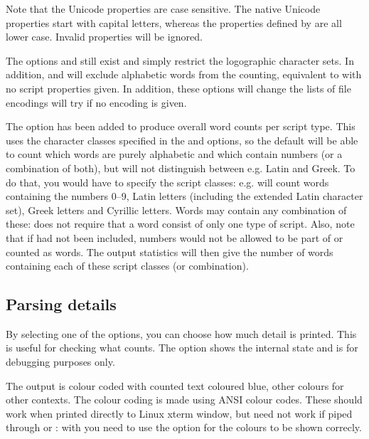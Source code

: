 \documentclass{article}
\begin{document}
Note that the Unicode properties are case sensitive. The native Unicode properties start with capital letters, whereas the properties defined by \TeXcount{} are all lower case. Invalid properties will be ignored.

The options  and  still exist and simply restrict the logographic character sets. In addition,  and  will exclude alphabetic words from the counting, equivalent to  with no script properties given. In addition, these options will change the lists of file encodings \TeXcount{} will try if no encoding is given.

The option  has been added to produce overall word counts per script type. This uses the character classes specified in the  and  options, so the default will be able to count which words are purely alphabetic and which contain numbers (or a combination of both), but will not distinguish between e.g. Latin and Greek. To do that, you would have to specify the script classes: e.g.
will count words containing the numbers 0--9, Latin letters (including the extended Latin character set), Greek letters and Cyrillic letters. Words may contain any combination of these: \TeXcount{} does not require that a word consist of only one type of script. Also, note that if  had not been included, numbers would not be allowed to be part of or counted as words. The output statistics will then give the number of words containing each of these script classes (or combination).

\subsection{Parsing details}

By selecting one of the  options, you can choose how much detail is printed. This is useful for checking what \TeXcount{} counts. The option  shows the internal state and is for debugging purposes only.

The output is colour coded with counted text coloured blue, other colours for other contexts. The colour coding is made using ANSI colour codes. These should work when printed directly to Linux xterm window, but need not work if piped through  or : with  you need to use the option  for the colours to be shown correcly.
\end{document}
